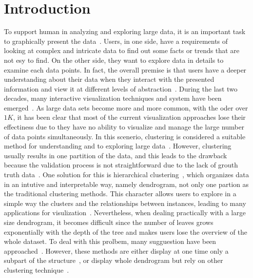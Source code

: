 \section{Introduction}
\label{sec:introduction}
To support human in analyzing and exploring large data, it is an important task to graphically present the data~\cite{yang2003interactive}. Users, in one side, have a requirements of looking at complex and intricate data to find out some facts or trends that are not esy to find. On the other side, they want to explore data in details to examine each data points. In fact, the overall premise is that users have a deeper understanding about their data when they interact with the presented information and view it at different levels of abstraction~\cite{roberts2007state}. During the last two decades, many interactive visualization techniques and system have been emerged~\cite{yang2003interactive,stroe2000scalable,fua2000structure}.
As large data sets become more and more common, with the oder over $1K$, it has been clear that most of the current visualization approaches lose their effectiness due to they have no ability to visualize and manage the large number of data points simultaneously. In this scenerio, clustering is considered a suitable method for understanding and to exploring large data~\cite{berkhin2006survey,bisson2012improving}. 
However, clustering usually results in one partition of the data, and this leads to the drawback because the validation process is not straightforward due to the lack of grouth truth data~\cite{candillier2006casade}. One solution for this is hierarchical clustering~\cite{johnson1967hierarchical}, which organizes data in an intutive and interpretable way, namely dendrogram, not only one partion as the traditional clustering methods.
This character allows users to explore in a simple way the clusters and the relationships between instances, leading to many applications for visulization~\cite{heard2009novel,landesberger2011visual,mahe2009graph}.
Nevertheless, when dealing practically with a large size dendrogram, it becomes difficult since the number of leaves grows exponentially with the depth of the tree and makes users lose the overview of the whole dataset. To deal with this prolbem, many sugguestion have been approached~\cite{bisson2012improving,landesberger2011visual,furnas2006fisheye}. However, these methods are either display at one time only a subpart of the structure~\cite{landesberger2011visual,furnas2006fisheye}, or display whole dendrogram but rely on other clustering technique~\cite{bisson2012improving}.

